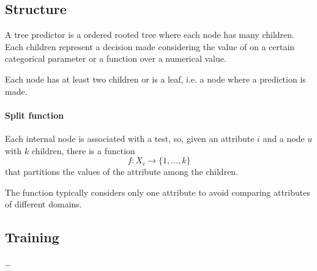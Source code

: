 \subsection{Structure}
A tree predictor is a ordered rooted tree where each node has many children.
Each children represent a decision made considering the value
of on a certain categorical parameter or a function over a numerical value.

Each node has at least two children or is a leaf, i.e. a node where a prediction is 
made.

\paragraph{Split function}
Each internal node is associated with a test, so, given an attribute 
$i$ and a node $u$ with $k$ children, there is a function
$$f : X_i \rightarrow \{1, \dots, k\}$$
that partitions the values of the attribute among the children.

\begin{remark}
    The function typically considers only one attribute to avoid 
    comparing attributes of different domains.
\end{remark}

\subsection{Training}
\dots
